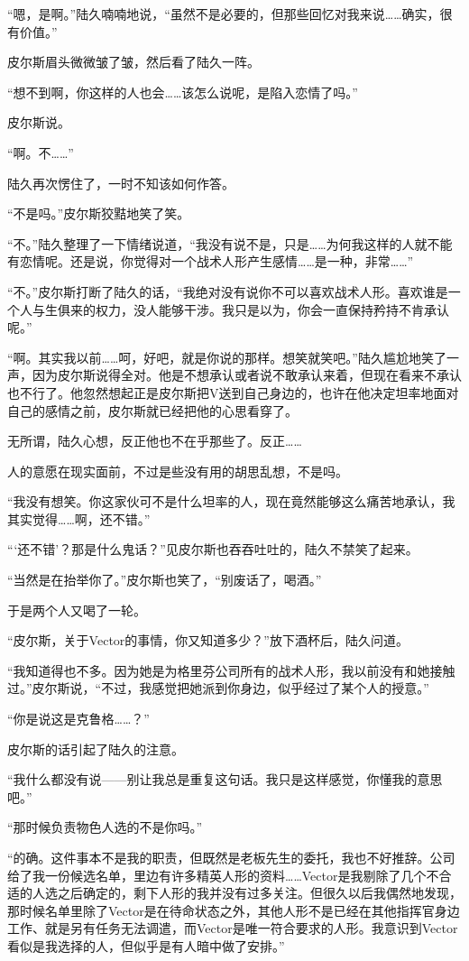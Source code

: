 “嗯，是啊。”陆久喃喃地说，“虽然不是必要的，但那些回忆对我来说……确实，很有价值。”

皮尔斯眉头微微皱了皱，然后看了陆久一阵。

“想不到啊，你这样的人也会……该怎么说呢，是陷入恋情了吗。”

皮尔斯说。

“啊。不……”

陆久再次愣住了，一时不知该如何作答。

“不是吗。”皮尔斯狡黠地笑了笑。

“不。”陆久整理了一下情绪说道，“我没有说不是，只是……为何我这样的人就不能有恋情呢。还是说，你觉得对一个战术人形产生感情……是一种，非常……”

“不。”皮尔斯打断了陆久的话，“我绝对没有说你不可以喜欢战术人形。喜欢谁是一个人与生俱来的权力，没人能够干涉。我只是以为，你会一直保持矜持不肯承认呢。”

“啊。其实我以前……呵，好吧，就是你说的那样。想笑就笑吧。”陆久尴尬地笑了一声，因为皮尔斯说得全对。他是不想承认或者说不敢承认来着，但现在看来不承认也不行了。他忽然想起正是皮尔斯把V送到自己身边的，也许在他决定坦率地面对自己的感情之前，皮尔斯就已经把他的心思看穿了。

无所谓，陆久心想，反正他也不在乎那些了。反正……

人的意愿在现实面前，不过是些没有用的胡思乱想，不是吗。

“我没有想笑。你这家伙可不是什么坦率的人，现在竟然能够这么痛苦地承认，我其实觉得……啊，还不错。”

“‘还不错’？那是什么鬼话？”见皮尔斯也吞吞吐吐的，陆久不禁笑了起来。

“当然是在抬举你了。”皮尔斯也笑了，“别废话了，喝酒。”

于是两个人又喝了一轮。

“皮尔斯，关于Vector的事情，你又知道多少？”放下酒杯后，陆久问道。

“我知道得也不多。因为她是为格里芬公司所有的战术人形，我以前没有和她接触过。”皮尔斯说，“不过，我感觉把她派到你身边，似乎经过了某个人的授意。”

“你是说这是克鲁格……？”

皮尔斯的话引起了陆久的注意。

“我什么都没有说——别让我总是重复这句话。我只是这样感觉，你懂我的意思吧。”

“那时候负责物色人选的不是你吗。”

“的确。这件事本不是我的职责，但既然是老板先生的委托，我也不好推辞。公司给了我一份候选名单，里边有许多精英人形的资料……Vector是我剔除了几个不合适的人选之后确定的，剩下人形的我并没有过多关注。但很久以后我偶然地发现，那时候名单里除了Vector是在待命状态之外，其他人形不是已经在其他指挥官身边工作、就是另有任务无法调遣，而Vector是唯一符合要求的人形。我意识到Vector看似是我选择的人，但似乎是有人暗中做了安排。”

